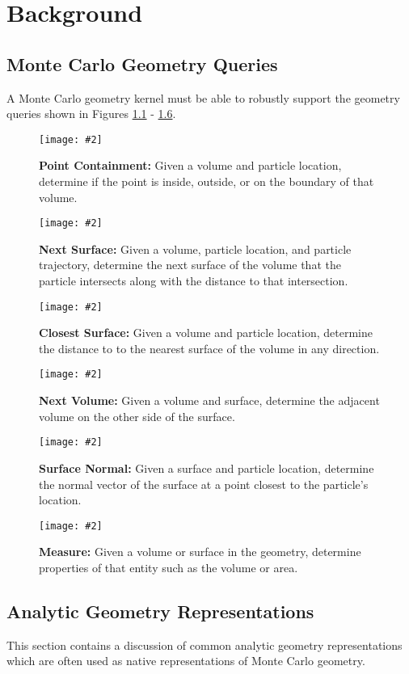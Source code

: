 \newcommand{\geomQuery}[3] {
  \begin{figure}[H]
    \centering
    \texttt{[image: \#2]}
    \caption{\textbf{#1:} #3}
    \label{fig:#1}
  \end{figure}
}

\chapter{Background}\label{ch:background}

\section{Monte Carlo Geometry Queries}\label{sec:mc-geom-queries}

A Monte Carlo geometry kernel must be able to robustly support the geometry
queries shown in Figures \ref{fig:Point Containment} - \ref{fig:Measure}.

\geomQuery{Point Containment}{plc_query.eps}{
    Given a volume and particle location, determine if the point is inside,
    outside, or on the boundary of that volume.
}

\geomQuery{Next Surface}{dtb_query.eps}{
  Given a volume, particle location, and particle trajectory, determine the next
  surface of the volume that the particle intersects along with the distance to
  that intersection.
}

\geomQuery{Closest Surface}{ctl_query.eps}{
  Given a volume and particle location, determine the distance to to the nearest
  surface of the volume in any direction.
}

\geomQuery{Next Volume}{sc_query.eps}{
  Given a volume and surface, determine the adjacent volume on the other side of
  the surface.
}

\geomQuery{Surface Normal}{normal_query.eps}{
  Given a surface and particle location, determine the normal vector of the
  surface at a point closest to the particle's location.
}

\geomQuery{Measure}{measure_query.eps}{
    Given a volume or surface in the geometry, determine properties of that entity
  such as the volume or area.
}

\section{Analytic Geometry Representations}\label{sec:analytic_geometry}

This section contains a discussion of common analytic geometry  representations
which are often used as native representations of Monte Carlo geometry.

